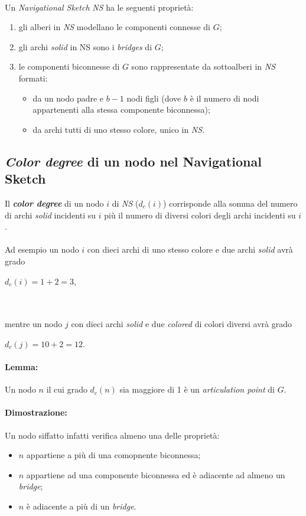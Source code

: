 \documentclass[a4paper,11pt]{report}
\begin{document}
\paragraph{}
Un \emph{Navigational Sketch} \emph{NS} ha le seguenti proprietà:
\begin{enumerate}
 \item gli alberi in \emph{NS} modellano le componenti connesse di $G$;
 \item gli archi \emph{solid} in NS sono i \emph{bridges} di $G$;
 \item le componenti biconnesse di $G$ sono rappresentate da sottoalberi in \emph{NS} formati:
\begin{itemize}
 \item da un nodo padre e $b-1$ nodi figli (dove $b$ è il numero di nodi appartenenti alla 
stessa componente biconnessa);
 \item da archi tutti di uno stesso colore, unico in \emph{NS}.
\end{itemize}
\end{enumerate}



\subsection{\emph{Color degree} di un nodo nel Navigational Sketch} \label{Color degree di un nodo nel Navigational Sketch}
Il \emph{\textbf{color degree}} di un nodo $i$ di \emph{NS} ($d_c(i)$) corrisponde alla somma del numero di archi \emph{solid} incidenti su
$i$ più il numero
di diversi colori degli archi incidenti su $i$.
\paragraph{}
Ad esempio un nodo $i$ con dieci archi di uno stesso colore e due archi \emph{solid} avrà grado \\\centerline{$d_c(i)=1+2=3$,}\\\\ mentre un
nodo $j$ con dieci archi \emph{solid} e due \emph{colored} di colori
diversi avrà grado \\\centerline{$d_c(j)=10+2=12$.}
\paragraph{Lemma:}
Un nodo $n$ il cui grado $d_c(n)$ sia maggiore di 1 è un \emph{articulation point} di $G$. 
\paragraph{Dimostrazione:}Un nodo siffatto infatti verifica almeno una delle proprietà:
\begin{itemize}
 \item $n$ appartiene a più di una comopnente biconnessa;
 \item $n$ appartiene ad una componente biconnessa ed è adiacente ad almeno un \emph{bridge};
 \item $n$ è adiacente a più di un \emph{bridge}.
\end{itemize}
\end{document}
